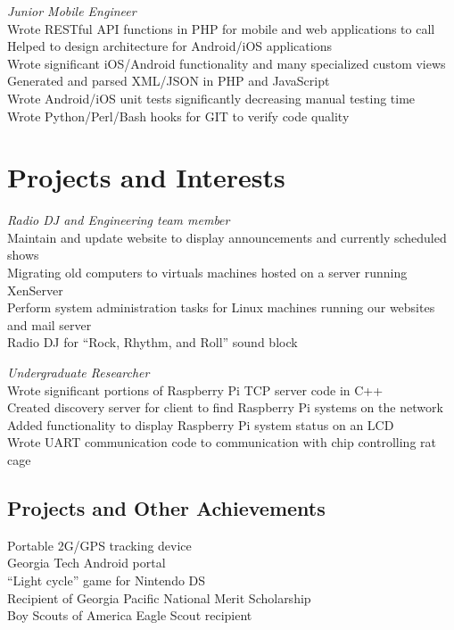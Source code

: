 \documentclass[line]{resume}
\begin{document}
\textit{Junior Mobile Engineer} \\
Wrote RESTful API functions in PHP for mobile and web applications to call \\
Helped to design architecture for Android/iOS applications \\
Wrote significant iOS/Android functionality and many specialized custom views \\
Generated and parsed XML/JSON in PHP and JavaScript \\
Wrote Android/iOS unit tests significantly decreasing manual testing time \\
Wrote Python/Perl/Bash hooks for GIT to verify code quality

\section{Projects and Interests}
\textit{Radio DJ and Engineering team member} \\
Maintain and update website to display announcements and currently scheduled shows \\
Migrating old computers to virtuals machines hosted on a server running XenServer \\
Perform system administration tasks for Linux machines running our websites and mail server \\
Radio DJ for ``Rock, Rhythm, and Roll'' sound block

\textit{Undergraduate Researcher} \\
Wrote significant portions of Raspberry Pi TCP server code in C++\\
Created discovery server for client to find Raspberry Pi systems on the network \\
Added functionality to display Raspberry Pi system status on an LCD \\
Wrote UART communication code to communication with chip controlling rat cage \\

\subsection{Projects and Other Achievements}
Portable 2G/GPS tracking device \\
Georgia Tech Android portal \\
``Light cycle'' game for Nintendo DS \\
Recipient of Georgia Pacific National Merit Scholarship \\
Boy Scouts of America Eagle Scout recipient
\end{document}
